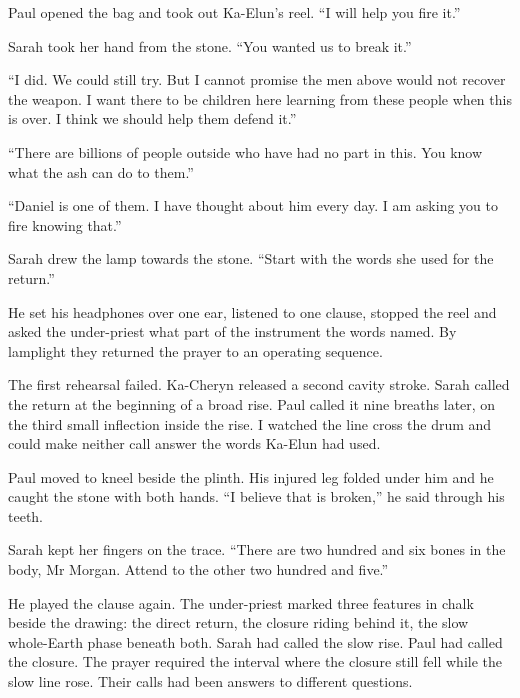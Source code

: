 Paul opened the bag and took out Ka-Elun's reel. ``I will help you fire it.''\par

Sarah took her hand from the stone. ``You wanted us to break it.''\par

``I did. We could still try. But I cannot promise the men above would not recover the weapon. I want there to be children here learning from these people when this is over. I think we should help them defend it.''\par

``There are billions of people outside who have had no part in this. You know what the ash can do to them.''\par

``Daniel is one of them. I have thought about him every day. I am asking you to fire knowing that.''\par

Sarah drew the lamp towards the stone. ``Start with the words she used for the return.''\par

He set his headphones over one ear, listened to one clause, stopped the reel and asked the under-priest what part of the instrument the words named. By lamplight they returned the prayer to an operating sequence.\par

The first rehearsal failed. Ka-Cheryn released a second cavity stroke. Sarah called the return at the beginning of a broad rise. Paul called it nine breaths later, on the third small inflection inside the rise. I watched the line cross the drum and could make neither call answer the words Ka-Elun had used.\par

Paul moved to kneel beside the plinth. His injured leg folded under him and he caught the stone with both hands. ``I believe that is broken,'' he said through his teeth.\par

Sarah kept her fingers on the trace. ``There are two hundred and six bones in the body, Mr Morgan. Attend to the other two hundred and five.''\par

He played the clause again. The under-priest marked three features in chalk beside the drawing: the direct return, the closure riding behind it, the slow whole-Earth phase beneath both. Sarah had called the slow rise. Paul had called the closure. The prayer required the interval where the closure still fell while the slow line rose. Their calls had been answers to different questions.\par


